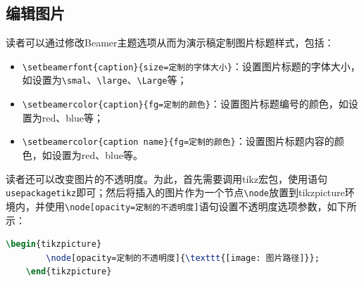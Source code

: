 \subsection{编辑图片}

读者可以通过修改Beamer主题选项从而为演示稿定制图片标题样式，包括：
\begin{itemize}
    \item \texttt{\textbackslash{}setbeamerfont\{caption\}\{size=定制的字体大小\}}：设置图片标题的字体大小，如设置为\texttt{\textbackslash{}smal}、\texttt{\textbackslash{}large}、\texttt{\textbackslash{}Large}等；
    \item \texttt{\textbackslash{}setbeamercolor\{caption\}\{fg=定制的颜色\}}：设置图片标题编号的颜色，如设置为red、blue等；
    \item \texttt{\textbackslash{}setbeamercolor\{caption name\}\{fg=定制的颜色\}}：设置图片标题内容的颜色，如设置为red、blue等。
\end{itemize}

读者还可以改变图片的不透明度。为此，首先需要调用tikz宏包，使用语句\texttt{usepackage{tikz}}即可；然后将插入的图片作为一个节点\texttt{\textbackslash{}node}放置到tikzpicture环境内，并使用\texttt{\textbackslash{}node[opacity=定制的不透明度]}语句设置不透明度选项参数，如下所示：
\begin{lstlisting}[language=TeX]
    \begin{tikzpicture}
        \node[opacity=定制的不透明度]{\texttt{[image: 图片路径]}};   
    \end{tikzpicture}
\end{lstlisting}

